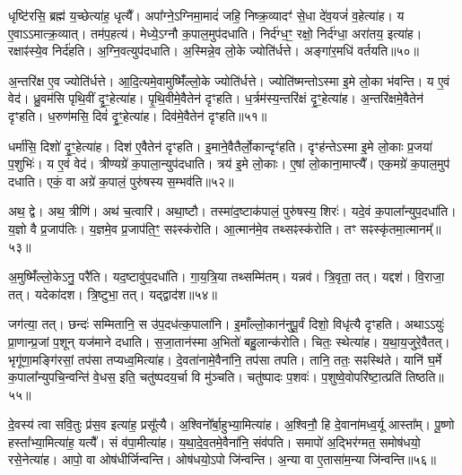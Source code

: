 धृष्टि॑रसि॒ ब्रह्म॑ य॒च्छेत्या॑ह॒ धृत्यै᳚।
अपा᳚ग्ने॒\-ऽग्निमा॒मादं॑ जहि॒ निष्क्र॒व्यादꣳ॑ से॒धा दे॑व॒यजं॑ व॒हेत्या॑ह।
य ए॒वाऽऽमात्क्र॒व्यात्।
तम॑प॒हत्य॑।
मेध्ये॒\-ऽग्नौ क॒पाल॒मुप॑दधाति।
निर्द॑ग्ध॒ꣳ॒ रक्षो॒ निर्द॑ग्धा॒ अरा॑तय॒ इत्या॑ह।
रक्षाꣴ॑स्ये॒व निर्द॑हति।
अ॒ग्नि॒वत्युप॑दधाति।
अ॒स्मिन्ने॒व लो॒के ज्योति॑र्धत्ते।
अङ्गा॑र॒मधि॑ वर्तयति॥५०॥

अ॒न्तरि॑क्ष ए॒व ज्योति॑र्धत्ते।
आ॒दि॒त्यमे॒वामुष्मिँ॑ल्लो॒के ज्योति॑र्धत्ते।
ज्योति॑ष्मन्तो\-ऽस्मा इ॒मे लो॒का भ॑वन्ति।
य ए॒वं वेद॑।
ध्रु॒वम॑सि पृथि॒वीं दृ॒ꣳ॒हेत्या॑ह।
पृ॒थि॒वीमे॒वैतेन॑ दृꣳहति।
ध॒र्त्रम॑स्य॒न्तरि॑क्षं दृ॒ꣳ॒हेत्या॑ह।
अ॒न्तरि॑क्षमे॒वैतेन॑ दृꣳहति।
ध॒रुण॑मसि॒ दिवं॑ दृ॒ꣳ॒हेत्या॑ह।
दिव॑मे॒वैतेन॑ दृꣳहति॥५१॥

धर्मा॑सि॒ दिशो॑ दृ॒ꣳ॒हेत्या॑ह।
दिश॑ ए॒वैतेन॑ दृꣳहति।
इ॒माने॒वैतैर्लो॒कान्दृꣳ॑हति।
दृꣳह॑न्ते\-ऽस्मा इ॒मे लो॒काः प्र॒जया॑ प॒शुभिः॑।
य ए॒वं वेद॑।
त्रीण्यग्रे॑ क॒पाला॒न्युप॑दधाति।
त्रय॑ इ॒मे लो॒काः।
ए॒षां लो॒काना॒माप्त्यै᳚।
एक॒मग्रे॑ क॒पाल॒मुप॑ दधाति।
एकं॒ वा अग्रे॑ क॒पालं॒ पुरु॑षस्य स॒म्भव॑ति॥५२॥

अथ॒ द्वे।
अथ॒ त्रीणि॑।
अथ॑ च॒त्वारि॑।
अथा॒ष्टौ।
तस्मा॑द॒ष्टा\-क॑पालं॒ पुरु॑षस्य॒ शिरः॑।
यदे॒वं क॒पाला᳚न्युप॒दधा॑ति।
य॒ज्ञो वै प्र॒जा\-प॑तिः।
य॒ज्ञमे॒व प्र॒जा\-प॑ति॒ꣳ॒ सꣴस्क॑रोति।
आ॒त्मान॑मे॒व तथ्सꣴस्क॑रोति।
तꣳ सꣴस्कृ॑तमा॒त्मानम्᳚॥५३॥

अ॒मुष्मिँ॑ल्लो॒केऽनु॒ परै॑ति।
यद॒ष्टावु॑प॒दधा॑ति।
गा॒य॒त्रि॒या तथ्सम्मि॑तम्।
यन्नव॑।
त्रि॒वृता॒ तत्।
यद्दश॑।
वि॒राजा॒ तत्।
यदेका॑दश।
त्रि॒ष्टुभा॒ तत्।
यद्द्वाद॑श॥५४॥

जग॑त्या॒ तत्।
छन्दः॑ सम्मितानि॒ स उ॑प॒दध॑त्क॒पाला॑नि।
इ॒माँल्लो॒कान॑नुपू॒र्वं दिशो॒ विधृ॑त्यै दृꣳहति।
अथाऽऽयुः॑ प्रा॒णान्प्र॒जां प॒शून् यज॑माने दधाति।
स॒जा॒तान॑स्मा अ॒भितो॑ बहु॒लान्क॑रोति।
चितः॒ स्थेत्या॑ह।
य॒था॒\-य॒जु\-रे॒वै\-तत्।
भृगू॑णा॒मङ्गि॑रसां॒ तप॑सा तप्यध्व॒मित्या॑ह।
दे॒वता॑नामे॒वैना॑नि॒ तप॑सा तपति।
तानि॒ ततः॒ सꣴस्थि॑ते।
यानि॑ घ॒र्मे क॒पाला᳚न्युपचि॒न्वन्ति॑ वे॒धस॒ इति॒ चतु॑ष्पदय॒र्चा वि मु॑ञ्चति।
चतु॑ष्पादः प॒शवः॑।
प॒शुष्वे॒वोपरि॑ष्टा॒त्प्रति॑ तिष्ठति॥५५॥

दे॒वस्य॑ त्वा सवि॒तुः प्र॑स॒व इत्या॑ह॒ प्रसू᳚त्यै।
अ॒श्विनो᳚र्बा॒हुभ्या॒मि\-त्या॑ह।
अ॒श्विनौ॒ हि दे॒वाना॑मध्व॒र्यू आस्ता᳚म्।
पू॒ष्णो हस्ता᳚भ्या॒मित्या॑ह॒ यत्यै᳚।
सं व॑पा॒मीत्या॑ह।
य॒था॒दे॒व॒तमे॒वैना॑नि॒ संव॑पति।
समापो॑ अ॒द्भिर॑ग्मत॒ समोष॑धयो॒ रसे॒नेत्या॑ह।
आपो॒ वा ओष॑धीर्जिन्वन्ति।
ओष॑धयो॒ऽपो जि॑न्वन्ति।
अ॒न्या वा ए॒तासा॑म॒न्या जि॑न्वन्ति॥५६॥

